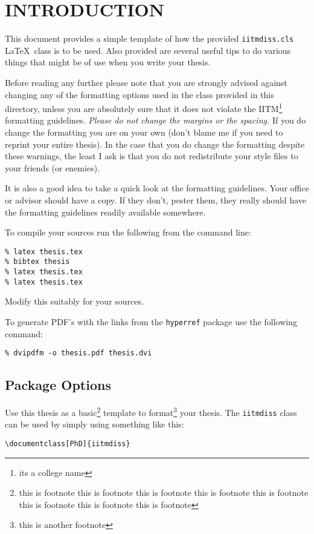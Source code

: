 \documentclass[MS]{iitmdiss}
\begin{document}


\chapter{INTRODUCTION}
\label{chap:intro}

This document provides a simple template of how the provided
\verb+iitmdiss.cls+ \LaTeX\ class is to be used.  Also provided are
several useful tips to do various things that might be of use when you
write your thesis.

Before reading any further please note that you are strongly advised
against changing any of the formatting options used in the class
provided in this directory, unless you are absolutely sure that it
does not violate the IITM\footnote{its a college name} formatting guidelines.  \emph{Please do not
  change the margins or the spacing.}  If you do change the formatting
you are on your own (don't blame me if you need to reprint your entire
thesis).  In the case that you do change the formatting despite these
warnings, the least I ask is that you do not redistribute your style
files to your friends (or enemies).

It is also a good idea to take a quick look at the formatting
guidelines.  Your office or advisor should have a copy.  If they
don't, pester them, they really should have the formatting guidelines
readily available somewhere.

To compile your sources run the following from the command line:
\begin{verbatim}
% latex thesis.tex
% bibtex thesis
% latex thesis.tex
% latex thesis.tex
\end{verbatim}
Modify this suitably for your sources.

To generate PDF's with the links from the \verb+hyperref+ package use
the following command:
\begin{verbatim}
% dvipdfm -o thesis.pdf thesis.dvi
\end{verbatim}

\section{Package Options}

Use this thesis as a basic\footnote{this is footnote this is footnote this is footnote this is footnote this is footnote this is footnote this is footnote this is footnote} template to format\footnote{this is another footnote} your thesis.  The
\verb+iitmdiss+ class can be used by simply using something like this:
\begin{verbatim}
\documentclass[PhD]{iitmdiss}  
\end{verbatim}
\end{document}

